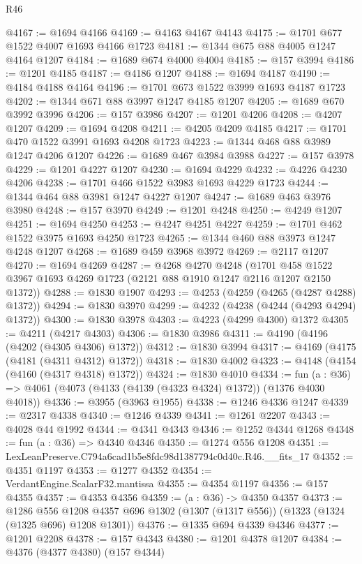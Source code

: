\begin{lexlean}{R46}
\begin{coremodule}
@4167 := @1694 @4166
@4169 := @4163 @4167 @4143
@4175 := @1701 @677 @1522 @4007 @1693 @4166 @1723
@4181 := @1344 @675 @88 @4005 @1247 @4164 @1207
@4184 := @1689 @674 @4000 @4004
@4185 := @157 @3994
@4186 := @1201 @4185
@4187 := @4186 @1207
@4188 := @1694 @4187
@4190 := @4184 @4188 @4164
@4196 := @1701 @673 @1522 @3999 @1693 @4187 @1723
@4202 := @1344 @671 @88 @3997 @1247 @4185 @1207
@4205 := @1689 @670 @3992 @3996
@4206 := @157 @3986
@4207 := @1201 @4206
@4208 := @4207 @1207
@4209 := @1694 @4208
@4211 := @4205 @4209 @4185
@4217 := @1701 @470 @1522 @3991 @1693 @4208 @1723
@4223 := @1344 @468 @88 @3989 @1247 @4206 @1207
@4226 := @1689 @467 @3984 @3988
@4227 := @157 @3978
@4229 := @1201 @4227 @1207
@4230 := @1694 @4229
@4232 := @4226 @4230 @4206
@4238 := @1701 @466 @1522 @3983 @1693 @4229 @1723
@4244 := @1344 @464 @88 @3981 @1247 @4227 @1207
@4247 := @1689 @463 @3976 @3980
@4248 := @157 @3970
@4249 := @1201 @4248
@4250 := @4249 @1207
@4251 := @1694 @4250
@4253 := @4247 @4251 @4227
@4259 := @1701 @462 @1522 @3975 @1693 @4250 @1723
@4265 := @1344 @460 @88 @3973 @1247 @4248 @1207
@4268 := @1689 @459 @3968 @3972
@4269 := @2117 @1207
@4270 := @1694 @4269
@4287 := @4268
    @4270
    @4248
    (@1701 @458 @1522 @3967 @1693 @4269 @1723 (@2121 @88 @1910 @1247 @2116 @1207 @2150 @1372))
@4288 := @1830 @1907
@4293 := @4253 (@4259 (@4265 (@4287 @4288) @1372))
@4294 := @1830 @3970
@4299 := @4232 (@4238 (@4244 (@4293 @4294) @1372))
@4300 := @1830 @3978
@4303 := @4223 (@4299 @4300) @1372
@4305 := @4211 (@4217 @4303)
@4306 := @1830 @3986
@4311 := @4190 (@4196 (@4202 (@4305 @4306) @1372))
@4312 := @1830 @3994
@4317 := @4169 (@4175 (@4181 (@4311 @4312) @1372))
@4318 := @1830 @4002
@4323 := @4148 (@4154 (@4160 (@4317 @4318) @1372))
@4324 := @1830 @4010
@4334 := fun (a : @36) => @4061 (@4073 (@4133 (@4139 (@4323 @4324) @1372)) (@1376 @4030 @4018))
@4336 := @3955 (@3963 @1955)
@4338 := @1246 @4336 @1247
@4339 := @2317 @4338
@4340 := @1246 @4339
@4341 := @1261 @2207
@4343 := @4028 @44 @1992
@4344 := @4341 @4343
@4346 := @1252 @4344 @1268
@4348 := fun (a : @36) => @4340 @4346
@4350 := @1274 @556 @1208
@4351 := LexLeanPreserve.C794a6cad1b5e8fdc98d1387794c0d40c.R46.__fits_17
@4352 := @4351 @1197
@4353 := @1277 @4352
@4354 := VerdantEngine.ScalarF32.mantissa
@4355 := @4354 @1197
@4356 := @157 @4355
@4357 := @4353 @4356
@4359 := (a : @36) -> @4350 @4357
@4373 := @1286
    @556
    @1208
    @4357
    @696
    @1302
    (@1307 (@1317 @556))
    (@1323 (@1324 (@1325 @696) @1208 @1301))
@4376 := @1335 @694 @4339 @4346
@4377 := @1201 @2208
@4378 := @157 @4343
@4380 := @1201 @4378 @1207
@4384 := @4376 (@4377 @4380) (@157 @4344)

\end{coremodule}
\end{lexlean}

